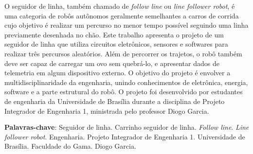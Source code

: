 \setlength{\absparsep}{18pt}
\begin{resumo}
  O seguidor de linha, também chamado de \textit{follow line} ou
  \textit{line follower robot}, é uma categoria de robôs autônomos geralmente
  semelhantes a carros de corrida cujo objetivo é realizar um percurso no menor
  tempo possível seguindo uma linha previamente desenhada no chão. Este trabalho
  apresenta o projeto de um seguidor de linha que utiliza circuitos eletrônicos,
  sensores e softwares para realizar três percursos aleatórios. Além de
  percorrer os trajetos, o robô também deve ser capaz de carregar um ovo sem
  quebrá-lo, e apresentar dados de telemetria em algum dispositivo externo. O
  objetivo do projeto é envolver a multidisciplinaridade da engenharia, unindo
  conhecimentos de eletrônica, energia, software e a parte estrutural do robô.
  O projeto foi desenvolvido por estudantes de engenharia da Universidade de
  Brasília durante a disciplina de Projeto Integrador de Engenharia 1,
  ministrada pelo professor Diogo Garcia.

  \textbf{Palavras-chave}:
    Seguidor de linha. Carrinho seguidor de linha. \textit{Follow line}.
    \textit{Line follower robot}. Engenharia. Projeto Integrador de Engenharia
    1. Universidade de Brasília. Faculdade do Gama. Diogo Garcia.
\end{resumo}
